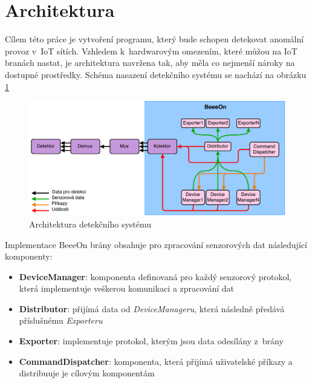  \section{Architektura}
 Cílem této práce je vytvoření programu, který bude schopen detekovat anomální provoz v~IoT sítích. 
 Vzhledem k~hardwarovým omezením, které můžou na IoT branách nastat, je architektura navržena tak, aby
 měla co nejmenší nároky na dostupné prostředky. Schéma nasazení detekčního systému se nachází
 na obrázku \ref{obr.deploy-arch}
 
 \begin{figure}[ht]
   \begin{center}
   \includegraphics[scale=0.41]{pictures/deploy-arch}
   \caption{Architektura detekčního systému}
   \label{obr.deploy-arch}
   \end{center}
   \end{figure}
 
 Implementace BeeeOn brány obsahuje pro zpracování senzorových dat následující komponenty:
 \begin{itemize}
  \item \textbf{DeviceManager}:
    komponenta definovaná pro každý senzorový protokol, která implementuje veškerou komunikaci
    a zpracování dat
    
  \item \textbf{Distributor}:  
  přijímá data od \textit{DeviceManageru}, která následně předává příslušnému \textit{Exporteru}
  
  \item \textbf{Exporter}:
  implementuje protokol, kterým jsou data odesílány z~brány
  
  \item \textbf{CommandDispatcher}:  
  komponenta, která přijímá uživatelské příkazy a distribuuje je cílovým komponentám
  
 \end{itemize}
 
